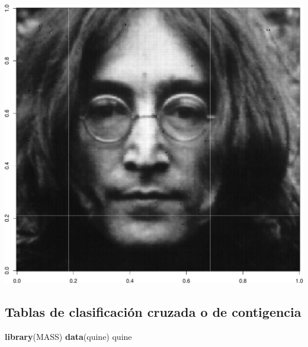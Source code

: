 \documentclass[]{article}
\newenvironment{Shaded}{\begin{snugshade}}{\end{snugshade}}
\newcommand{\KeywordTok}[1]{\textcolor[rgb]{0.13,0.29,0.53}{\textbf{{#1}}}}
\newcommand{\NormalTok}[1]{{#1}}
\numberwithin{equation}{section}
\begin{document}
\includegraphics{tema1_files/figure-latex/unnamed-chunk-88-1.pdf}

\subsection{Tablas de clasificación cruzada o de
contigencia}\label{tablas-de-clasificacion-cruzada-o-de-contigencia}

\begin{Shaded}
\begin{Highlighting}[]
\KeywordTok{library}\NormalTok{(MASS)}
\KeywordTok{data}\NormalTok{(quine)}
\NormalTok{quine}
\end{Highlighting}
\end{Shaded}
\end{document}

